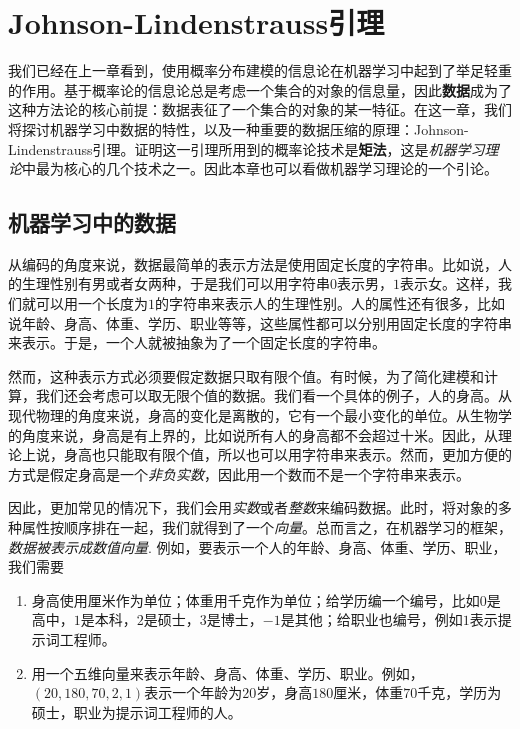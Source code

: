 \chapter{Johnson-Lindenstrauss引理}\label{cha:J-L-Lemma}

我们已经在上一章看到，使用概率分布建模的信息论在机器学习中起到了举足轻重的作用。基于概率论的信息论总是考虑一个集合的对象的信息量，因此\textbf{数据}成为了这种方法论的核心前提：数据表征了一个集合的对象的某一特征。在这一章，我们将探讨机器学习中数据的特性，以及一种重要的数据压缩的原理：Johnson-Lindenstrauss引理。证明这一引理所用到的概率论技术是\textbf{矩法}，这是\emph{机器学习理论}中最为核心的几个技术之一。因此本章也可以看做机器学习理论的一个引论。

\section{机器学习中的数据}
从编码的角度来说，数据最简单的表示方法是使用固定长度的字符串。比如说，人的生理性别有男或者女两种，于是我们可以用字符串$0$表示男，$1$表示女。这样，我们就可以用一个长度为$1$的字符串来表示人的生理性别。人的属性还有很多，比如说年龄、身高、体重、学历、职业等等，这些属性都可以分别用固定长度的字符串来表示。于是，一个人就被抽象为了一个固定长度的字符串。

然而，这种表示方式必须要假定数据只取有限个值。有时候，为了简化建模和计算，我们还会考虑可以取无限个值的数据。我们看一个具体的例子，人的身高。从现代物理的角度来说，身高的变化是离散的，它有一个最小变化的单位。从生物学的角度来说，身高是有上界的，比如说所有人的身高都不会超过十米。因此，从理论上说，身高也只能取有限个值，所以也可以用字符串来表示。然而，更加方便的方式是假定身高是一个\emph{非负实数}，因此用一个数而不是一个字符串来表示。

因此，更加常见的情况下，我们会用\emph{实数}或者\emph{整数}来编码数据。此时，将对象的多种属性按顺序排在一起，我们就得到了一个\emph{向量}。总而言之，在机器学习的框架，\emph{数据被表示成数值向量}. 例如，要表示一个人的年龄、身高、体重、学历、职业，我们需要
\begin{enumerate}
    \item 身高使用厘米作为单位；体重用千克作为单位；给学历编一个编号，比如$0$是高中，$1$是本科，$2$是硕士，$3$是博士，$-1$是其他；给职业也编号，例如$1$表示提示词工程师。
    \item 用一个五维向量来表示年龄、身高、体重、学历、职业。例如，$(20, 180, 70, 2, 1)$表示一个年龄为$20$岁，身高$180$厘米，体重$70$千克，学历为硕士，职业为提示词工程师的人。
\end{enumerate}

